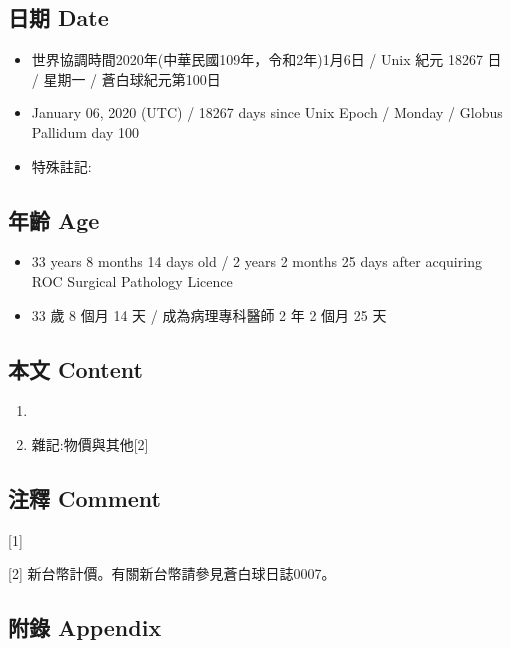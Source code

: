 \documentclass[
]{article}
\providecommand{\tightlist}{%
  \setlength{\itemsep}{0pt}\setlength{\parskip}{0pt}}
\begin{document}
\hypertarget{ux65e5ux671f-date-36}{%
\subsection{日期 Date}\label{ux65e5ux671f-date-36}}

\begin{itemize}
\tightlist
\item
  世界協調時間2020年(中華民國109年，令和2年)1月6日 / Unix 紀元 18267 日
  / 星期一 / 蒼白球紀元第100日
\item
  January 06, 2020 (UTC) / 18267 days since Unix Epoch / Monday / Globus
  Pallidum day 100
\item
  特殊註記:
\end{itemize}

\hypertarget{ux5e74ux9f61-age-36}{%
\subsection{年齡 Age}\label{ux5e74ux9f61-age-36}}

\begin{itemize}
\tightlist
\item
  33 years 8 months 14 days old / 2 years 2 months 25 days after
  acquiring ROC Surgical Pathology Licence
\item
  33 歲 8 個月 14 天 / 成為病理專科醫師 2 年 2 個月 25 天
\end{itemize}

\hypertarget{ux672cux6587-content-36}{%
\subsection{本文 Content}\label{ux672cux6587-content-36}}

\begin{enumerate}
\def\labelenumi{\arabic{enumi}.}
\item
\item
  雜記:物價與其他{[}2{]}
\end{enumerate}

\hypertarget{ux6ce8ux91cb-comment-35}{%
\subsection{注釋 Comment}\label{ux6ce8ux91cb-comment-35}}

{[}1{]}

{[}2{]} 新台幣計價。有關新台幣請參見蒼白球日誌0007。

\hypertarget{ux9644ux9304-appendix-36}{%
\subsection{附錄 Appendix}\label{ux9644ux9304-appendix-36}}
\end{document}
